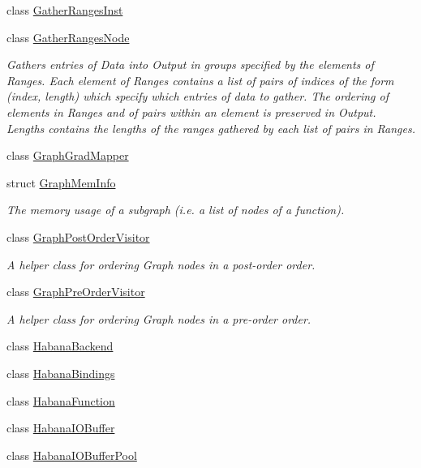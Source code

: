 \begin{DoxyCompactItemize}
class \hyperlink{classglow_1_1_gather_ranges_inst}{Gather\+Ranges\+Inst}
\item 
class \hyperlink{classglow_1_1_gather_ranges_node}{Gather\+Ranges\+Node}
\begin{DoxyCompactList}\small\item\em Gathers entries of Data into Output in groups specified by the elements of Ranges. Each element of Ranges contains a list of pairs of indices of the form (index, length) which specify which entries of data to gather. The ordering of elements in Ranges and of pairs within an element is preserved in Output. Lengths contains the lengths of the ranges gathered by each list of pairs in Ranges. \end{DoxyCompactList}\item 
class \hyperlink{classglow_1_1_graph_grad_mapper}{Graph\+Grad\+Mapper}
\item 
struct \hyperlink{structglow_1_1_graph_mem_info}{Graph\+Mem\+Info}
\begin{DoxyCompactList}\small\item\em The memory usage of a subgraph (i.\+e. a list of nodes of a function). \end{DoxyCompactList}\item 
class \hyperlink{classglow_1_1_graph_post_order_visitor}{Graph\+Post\+Order\+Visitor}
\begin{DoxyCompactList}\small\item\em A helper class for ordering Graph nodes in a post-\/order order. \end{DoxyCompactList}\item 
class \hyperlink{classglow_1_1_graph_pre_order_visitor}{Graph\+Pre\+Order\+Visitor}
\begin{DoxyCompactList}\small\item\em A helper class for ordering Graph nodes in a pre-\/order order. \end{DoxyCompactList}\item 
class \hyperlink{classglow_1_1_habana_backend}{Habana\+Backend}
\item 
class \hyperlink{classglow_1_1_habana_bindings}{Habana\+Bindings}
\item 
class \hyperlink{classglow_1_1_habana_function}{Habana\+Function}
\item 
class \hyperlink{classglow_1_1_habana_i_o_buffer}{Habana\+I\+O\+Buffer}
\item 
class \hyperlink{classglow_1_1_habana_i_o_buffer_pool}{Habana\+I\+O\+Buffer\+Pool}
\item 

\end{DoxyCompactItemize}
